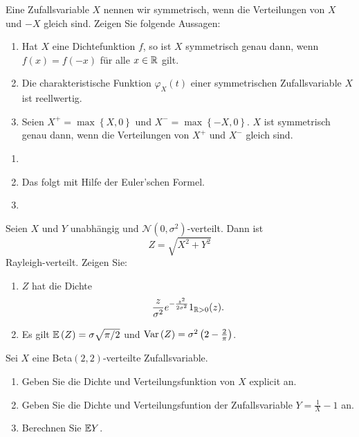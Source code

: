  Eine Zufallsvariable $X$ nennen wir
symmetrisch, wenn die Verteilungen von $X$ und $-X$ gleich sind. 
Zeigen Sie folgende Aussagen:
\begin{enumerate}
    \item Hat $X$ eine Dichtefunktion $f$, so ist $X$ symmetrisch genau
        dann, wenn $f(x)= f(-x)$ für alle $x\in\mathbb R$ gilt. 
    \item Die charakteristische Funktion $\varphi_{X}(t)$ einer symmetrischen
        Zufallsvariable $X$ ist reellwertig. 
    \item Seien $X^{+} = \max\left\{ X,0 \right\}$ und $X^{-} = \max\left\{ -X,0 \right\}$.
        $X$ ist symmetrisch genau dann, wenn die Verteilungen von $X^{+}$ und $X^{-}$ 
        gleich sind.
\end{enumerate}

\solution
\begin{enumerate}
    \item 

    \item Das folgt mit Hilfe der Euler'schen Formel.

    \item 
\end{enumerate}


  Seien $X$ und $Y$ unabhängig und 
$\mathcal N (0, \sigma^2)$-verteilt. Dann ist
\begin{equation*}
    Z= \sqrt{X^2 + Y^2} 
\end{equation*}
Rayleigh-verteilt. Zeigen Sie:
\begin{enumerate}
    \item $Z$ hat die Dichte
        \begin{equation*}
            \frac{z}{\sigma^2}e^{-\frac{z^2}{2\sigma^2}}1_{\mathbb{R}>0}(z).
        \end{equation*}
    \item Es gilt $\mathbb{E}\left( Z \right) = \sigma \sqrt{\pi/2}$ und $\operatorname{Var}\left( Z
        \right) = \sigma^2 \left( 2 - \frac{2}{\pi} \right)$.
\end{enumerate}



 Sei $X$ eine Beta$(2,2)$-verteilte Zufallsvariable.
\begin{enumerate}
    \item Geben Sie die Dichte und Verteilungsfunktion von $X$ explicit an. 
    \item Geben Sie die Dichte und Verteilungsfuntion der Zufallsvariable
        $Y = \frac{1}{X} - 1$ an. 
    \item Berechnen Sie $\mathbb{E} Y$.  
\end{enumerate}


